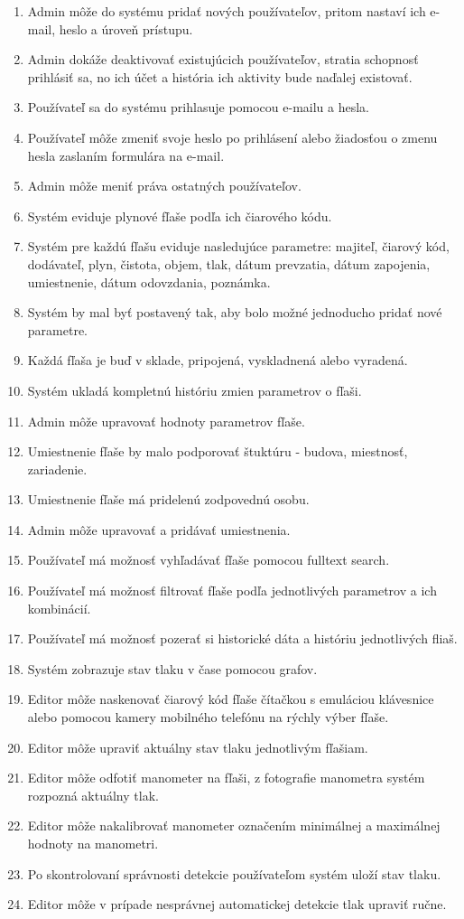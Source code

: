 \documentclass[hreffootnote]{zah}
\begin{document}
\begin{enumerate}
\item Admin môže do systému pridať nových používateľov, pritom nastaví ich e-mail, heslo a úroveň prístupu.
\item Admin dokáže deaktivovať existujúcich používateľov, stratia schopnosť prihlásiť sa, no ich účet a história ich aktivity bude naďalej existovať.
\item Používateľ sa do systému prihlasuje pomocou e-mailu a hesla.
\item Používateľ môže zmeniť svoje heslo po prihlásení alebo žiadosťou o zmenu hesla zaslaním formulára na e-mail.
\item Admin môže meniť práva ostatných používateľov.
\item Systém eviduje plynové fľaše podľa ich čiarového kódu.
\item Systém pre každú fľašu eviduje nasledujúce parametre: majiteľ, čiarový kód, dodávateľ, plyn, čistota, objem, tlak, dátum prevzatia, dátum zapojenia, umiestnenie, dátum odovzdania, poznámka.
\item Systém by mal byť postavený tak, aby bolo možné jednoducho pridať nové parametre.
\item Každá fľaša je buď v sklade, pripojená, vyskladnená alebo vyradená.
\item Systém ukladá kompletnú históriu zmien parametrov o fľaši.
\item Admin môže upravovať hodnoty parametrov fľaše.
\item Umiestnenie fľaše by malo podporovať štuktúru - budova, miestnosť, zariadenie.
\item Umiestnenie fľaše má pridelenú zodpovednú osobu.
\item Admin môže upravovať a pridávať umiestnenia.
\item Používateľ má možnosť vyhľadávať fľaše pomocou fulltext search.
\item Používateľ má možnosť filtrovať fľaše podľa jednotlivých parametrov a ich kombinácií.
\item Používateľ má možnosť pozerať si historické dáta a históriu jednotlivých fliaš.
\item Systém zobrazuje stav tlaku v čase pomocou grafov.
\item Editor môže naskenovať čiarový kód fľaše čítačkou s emuláciou klávesnice alebo pomocou kamery mobilného telefónu na rýchly výber fľaše.

\item Editor môže upraviť aktuálny stav tlaku jednotlivým fľašiam.
\item Editor môže odfotiť manometer na fľaši, z fotografie manometra systém rozpozná aktuálny tlak.
\item Editor môže nakalibrovať manometer označením minimálnej a maximálnej hodnoty na manometri.
\item Po skontrolovaní správnosti detekcie používateľom systém uloží stav tlaku.
\item Editor môže v prípade nesprávnej automatickej detekcie tlak upraviť ručne.


\end{enumerate}
\end{document}
